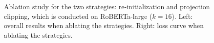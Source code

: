 \begin{figure}[h]
\centering
\begin{minipage}{0.48\textwidth}
\vspace{15pt}

\end{minipage}
\begin{minipage}{0.48\textwidth}
        \centering
        \vspace{-10pt}
        \vspace{-14pt}
    \end{minipage}%
    \vspace{5pt}
    \caption{Ablation study for the two strategies: re-initialization and projection clipping, which is conducted on RoBERTa-large ($k=16$). Left: overall results when ablating the strategies. Right: loss curve when ablating the strategies.}
\label{ablation_strategy}
\end{figure}
